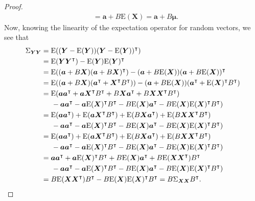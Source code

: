 \documentclass[12pt]{article}
\theoremstyle{definition}
\newcommand{\E}{\text{E}}
\newcommand{\vect}[1]{\boldsymbol{#1}}
\begin{document}
\begin{proof}
\begin{align*}
    &= \vect{a} + B\E(\vect{X}) = \vect{a} + B\vect{\mu}.
  \end{align*}
  Now, knowing the linearity of the expectation operator for random vectors, we see that
  \begin{align*}
    \Sigma_{\vect{Y}\vect{Y}}
    &= \E((\vect{Y} - \E(\vect{Y}))(\vect{Y} - \E(\vect{Y}))^\intercal) \\
    &= \E(\vect{Y}\vect{Y}^\intercal) - \E(\vect{Y})\E(\vect{Y})^\intercal \\
    &= \E((\vect{a} + B\vect{X})(\vect{a} + B\vect{X})^\intercal) - (\vect{a} + B \E(\vect{X}))(\vect{a} + B \E(\vect{X}))^\intercal \\
    &= \E((\vect{a} + B\vect{X})(\vect{a}^\intercal + \vect{X}^\intercal B^\intercal)) - (\vect{a} + B \E(\vect{X}))(\vect{a}^\intercal + \E(\vect{X})^\intercal B^\intercal) \\
    &= \E(\vect{a}\vect{a}^\intercal + \vect{a}\vect{X}^\intercal B^\intercal+  B\vect{X}\vect{a}^\intercal +  B\vect{X}\vect{X}^\intercal B^\intercal) \\ & \hspace{5mm}- \vect{a}\vect{a}^\intercal - \vect{a}\E(\vect{X})^\intercal B^\intercal - B \E(\vect{X}) \vect{a}^\intercal - B\E(\vect{X}) \E(\vect{X})^\intercal B^\intercal) \\
    &= \E(\vect{a}\vect{a}^\intercal) + \E(\vect{a}\vect{X}^\intercal B^\intercal) +  \E(B\vect{X}\vect{a}^\intercal) +  \E(B\vect{X}\vect{X}^\intercal B^\intercal) \\ & \hspace{5mm}- \vect{a}\vect{a}^\intercal - \vect{a}\E(\vect{X})^\intercal B^\intercal - B \E(\vect{X}) \vect{a}^\intercal - B\E(\vect{X}) \E(\vect{X})^\intercal B^\intercal) \\
    &= \E(\vect{a}\vect{a}^\intercal) + \E(\vect{a}\vect{X}^\intercal B^\intercal) +  \E(B\vect{X}\vect{a}^\intercal) +  \E(B\vect{X}\vect{X}^\intercal B^\intercal) \\ & \hspace{5mm}- \vect{a}\vect{a}^\intercal - \vect{a}\E(\vect{X})^\intercal B^\intercal - B \E(\vect{X}) \vect{a}^\intercal - B\E(\vect{X}) \E(\vect{X})^\intercal B^\intercal) \\
    &= \vect{a}\vect{a}^\intercal + \vect{a}\E(\vect{X})^\intercal B^\intercal +  B\E(\vect{X})\vect{a}^\intercal +  B\E(\vect{X}\vect{X}^\intercal) B^\intercal \\ & \hspace{5mm}- \vect{a}\vect{a}^\intercal - \vect{a}\E(\vect{X})^\intercal B^\intercal - B \E(\vect{X}) \vect{a}^\intercal - B\E(\vect{X}) \E(\vect{X})^\intercal B^\intercal) \\
    &= B\E(\vect{X}\vect{X}^\intercal)B^\intercal - B\E(\vect{X})\E(\vect{X})^\intercal B^\intercal = B \Sigma_{\vect{X}\vect{X}} B^\intercal.
  \end{align*}
\end{proof}
\end{document}
